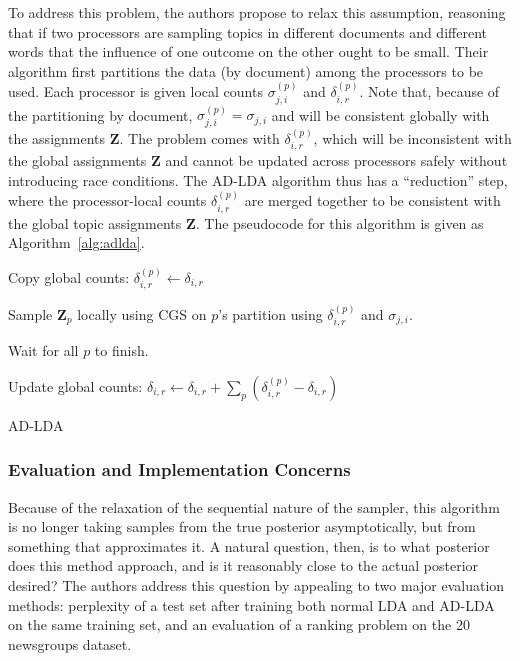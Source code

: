\documentclass[11pt]{article}
\begin{document}
To address this problem, the authors propose to relax this assumption,
reasoning that if two processors are sampling topics in different documents
and different words that the influence of one outcome on the other ought to
be small. Their algorithm first partitions the data (by document) among the
processors to be used. Each processor is given local counts
$\sigma_{j,i}^{(p)}$ and $\delta_{i,r}^{(p)}$. Note that, because of the
partitioning by document, $\sigma_{j,i}^{(p)} = \sigma_{j,i}$ and will be
consistent globally with the assignments $\mathbf{Z}$. The problem comes
with $\delta_{i,r}^{(p)}$, which will be inconsistent with the global
assignments $\mathbf{Z}$ and cannot be updated across processors safely
without introducing race conditions. The AD-LDA algorithm thus has a
``reduction'' step, where the processor-local counts $\delta_{i,r}^{(p)}$ are
merged together to be consistent with the global topic assignments
$\mathbf{Z}$. The pseudocode for this algorithm is given as
Algorithm~\ref{alg:adlda}.

\begin{algorithm}
  \begin{algorithmic}
    \Repeat

        Copy global counts: $\delta_{i,r}^{(p)} \leftarrow \delta_{i,r}$

        Sample $\mathbf{Z}_p$ locally using CGS on $p$'s partition using
        $\delta_{i,r}^{(p)}$ and $\sigma_{j,i}$.
      \EndFor

      Wait for all $p$ to finish.

      Update global counts: $\delta_{i,r} \leftarrow \delta_{i,r} + \sum_p
      (\delta_{i,r}^{(p)} - \delta_{i,r})$
  \end{algorithmic}
  \caption{AD-LDA}
  \label{alg:adlda}
\end{algorithm}

\subsubsection{Evaluation and Implementation Concerns}

Because of the relaxation of the sequential nature of the sampler, this
algorithm is no longer taking samples from the true posterior
asymptotically, but from something that approximates it. A natural
question, then, is to what posterior does this method approach, and is it
reasonably close to the actual posterior desired? The authors address this
question by appealing to two major evaluation methods: perplexity of a test
set after training both normal LDA and AD-LDA on the same training set, and
an evaluation of a ranking problem on the 20 newsgroups dataset.
\end{document}
